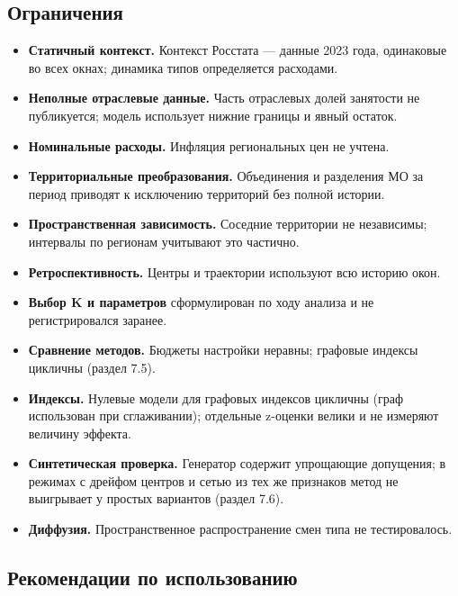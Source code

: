 \documentclass[11pt,a4paper]{article}
\providecommand{\tightlist}{\setlength{\itemsep}{1pt}\setlength{\parskip}{0pt}}
\begin{document}
\subsection{Ограничения}\label{ux43eux433ux440ux430ux43dux438ux447ux435ux43dux438ux44f-1}

\begin{itemize}
\tightlist
\item
  \textbf{Статичный контекст.} Контекст Росстата --- данные 2023 года, одинаковые во всех окнах; динамика типов определяется расходами.
\item
  \textbf{Неполные отраслевые данные.} Часть отраслевых долей занятости не публикуется; модель использует нижние границы и явный остаток.
\item
  \textbf{Номинальные расходы.} Инфляция региональных цен не учтена.
\item
  \textbf{Территориальные преобразования.} Объединения и разделения МО за период приводят к исключению территорий без полной истории.
\item
  \textbf{Пространственная зависимость.} Соседние территории не независимы; интервалы по регионам учитывают это частично.
\item
  \textbf{Ретроспективность.} Центры и траектории используют всю историю окон.
\item
  \textbf{Выбор K и параметров} сформулирован по ходу анализа и не регистрировался заранее.
\item
  \textbf{Сравнение методов.} Бюджеты настройки неравны; графовые индексы цикличны (раздел 7.5).
\item
  \textbf{Индексы.} Нулевые модели для графовых индексов цикличны (граф использован при сглаживании); отдельные z-оценки велики и не измеряют величину эффекта.
\item
  \textbf{Синтетическая проверка.} Генератор содержит упрощающие допущения; в режимах с дрейфом центров и сетью из тех же признаков метод не выигрывает у простых вариантов (раздел 7.6).
\item
  \textbf{Диффузия.} Пространственное распространение смен типа не тестировалось.
\end{itemize}

\subsection{Рекомендации по использованию}\label{ux440ux435ux43aux43eux43cux435ux43dux434ux430ux446ux438ux438-ux43fux43e-ux438ux441ux43fux43eux43bux44cux437ux43eux432ux430ux43dux438ux44e}
\end{document}

